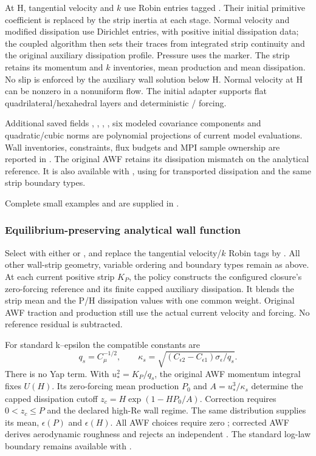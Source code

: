 At H, tangential velocity and $k$ use Robin entries tagged
. Their initial primitive coefficient is replaced by the
strip inertia at each stage. Normal velocity and modified dissipation use
Dirichlet entries, with positive initial dissipation data; the coupled
algorithm then sets their traces from integrated strip continuity and the
original auxiliary dissipation profile. Pressure uses the
 marker. The strip retains its momentum and $k$ inventories,
mean production and mean dissipation. No slip is enforced by the auxiliary
wall solution below H. Normal velocity at H can be nonzero in a nonuniform
flow. The initial adapter supports flat quadrilateral/hexahedral layers and
deterministic / forcing.

Additional saved fields , ,
, , six modeled covariance
components and quadratic/cubic norms are polynomial projections of current
model evaluations. Wall inventories, constraints, flux budgets and MPI sample
ownership are reported in .
The original AWF retains its dissipation mismatch on the analytical reference.
It is also available with , using  for
transported dissipation and the same strip boundary types.

Complete small examples  and 
are supplied in .

\subsubsection{Equilibrium-preserving analytical wall function}

Select  with either 
or , and
replace the tangential velocity/$k$ Robin tags by .
All other wall-strip geometry, variable ordering and boundary types remain
as above. At each current positive strip $K_P$, the policy constructs the
configured closure's zero-forcing reference and its finite capped auxiliary
dissipation. It blends the strip mean and the P/H dissipation values with
one common weight. Original AWF traction and production still use the actual
current velocity and forcing. No reference residual is subtracted.

For standard k--epsilon the compatible constants are
\begin{equation*}
q_s=C_\mu^{-1/2},\qquad
\kappa_s=\sqrt{(C_{\epsilon2}-C_{\epsilon1})\sigma_\epsilon/q_s}.
\end{equation*}
There is no Yap term. With $u_*^2=K_P/q_s$, the original AWF momentum
integral fixes $U(H)$. Its zero-forcing mean production $P_0$ and
$A=u_*^3/\kappa_s$ determine the capped dissipation cutoff
$z_c=H\exp(1-HP_0/A)$. Correction requires $0<z_c\le P$ and the
declared high-Re wall regime. The same distribution supplies its mean,
$\epsilon(P)$ and $\epsilon(H)$. All AWF choices require zero
; corrected AWF derives aerodynamic roughness and
rejects an independent . The standard log-law boundary
remains available with .

